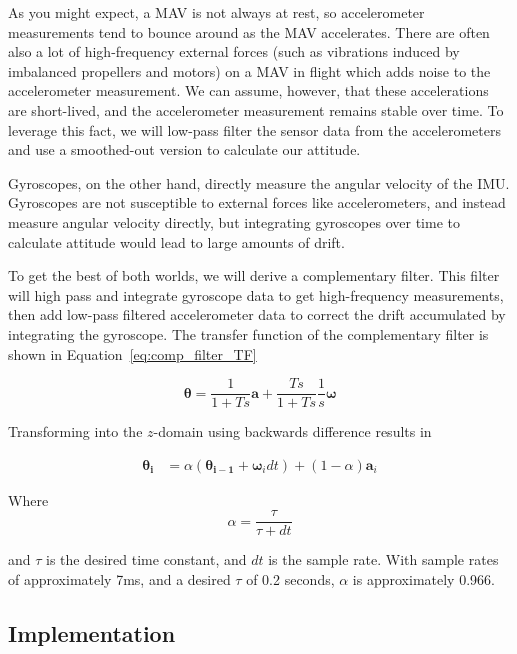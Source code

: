 \documentclass[paper=a4, fontsize=11pt]{scrartcl} %
\numberwithin{equation}{section} %
\numberwithin{figure}{section} %
\numberwithin{table}{section} %
\begin{document}
As you might expect, a MAV is not always at rest, so accelerometer measurements tend to bounce around as the MAV accelerates.  There are often also a lot of high-frequency external forces (such as vibrations induced by imbalanced propellers and motors) on a MAV in flight which adds noise to the accelerometer measurement.  We can assume, however, that these accelerations are short-lived, and the accelerometer measurement remains stable over time.  To leverage this fact, we will low-pass filter the sensor data from the accelerometers and use a smoothed-out version to calculate our attitude.

Gyroscopes, on the other hand, directly measure the angular velocity of the IMU.  Gyroscopes are not susceptible to external forces like accelerometers, and instead measure angular velocity directly, but integrating gyroscopes over time to calculate attitude would lead to large amounts of drift.

To get the best of both worlds, we will derive a complementary filter.  This filter will high pass and integrate gyroscope data to get high-frequency measurements, then add low-pass filtered accelerometer data to correct the drift accumulated by integrating the gyroscope.  The transfer function of the complementary filter is shown in Equation~\ref{eq:comp_filter_TF}

\begin{equation}
	\bm{\theta} = \frac{1}{1+Ts}\bm{a} + \frac{Ts}{1+Ts}\frac{1}{s}\bm{\omega}
	\label{eq:comp_filter_TF}
\end{equation}

Transforming into the $z$-domain using backwards difference results in

\begin{equation}
	\begin{aligned}
	  \bm{\theta_i} &= \alpha \left( \bm{\theta_{i-1}} + \bm{\omega}_i dt  \right) + (1-\alpha) \bm{a}_i
  \end{aligned}
\end{equation}

Where
\begin{equation}
	\alpha = \frac{\tau}{\tau + dt}
\end{equation}

and $\tau$ is the desired time constant, and $dt$ is the sample rate.  With sample rates of approximately 7ms, and a desired $\tau$ of 0.2 seconds, $\alpha$ is approximately 0.966.

\subsection{Implementation}
\end{document}
